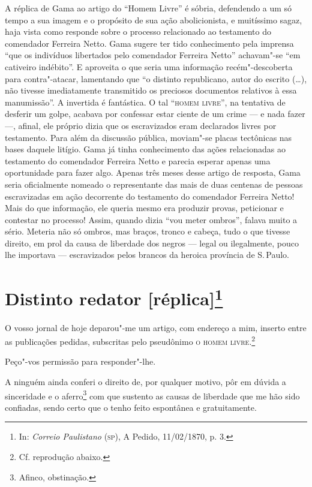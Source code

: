 {\small\noindent
A réplica de Gama ao artigo do ``Homem Livre'' é sóbria, defendendo
a um só tempo a sua imagem e o propósito de sua ação abolicionista, e
muitíssimo sagaz, haja vista como responde sobre o processo relacionado
ao testamento do comendador Ferreira Netto. Gama sugere ter tido
conhecimento pela imprensa ``que os indivíduos libertados pelo comendador
Ferreira Netto'' achavam"-se ``em cativeiro indébito''. E aproveita o que
seria uma informação recém"-descoberta para contra"-atacar, lamentando que
``o distinto republicano, autor do escrito (\ldots{}), não tivesse
imediatamente transmitido os preciosos documentos relativos à essa
manumissão''. A invertida é fantástica. O tal ``\textsc{homem livre}'', na tentativa
de desferir um golpe, acabava por confessar estar ciente de um crime ---
e nada fazer ---, afinal, ele próprio dizia que os escravizados eram
declarados livres por testamento. Para além da discussão pública,
moviam"-se placas tectônicas nas bases daquele litígio. Gama já tinha
conhecimento das ações relacionadas ao testamento do comendador Ferreira
Netto e parecia esperar apenas uma oportunidade para fazer algo. Apenas
três meses desse artigo de resposta, Gama seria oficialmente nomeado o
representante das mais de duas centenas de pessoas escravizadas em ação
decorrente do testamento do comendador Ferreira Netto! Mais do que
informação, ele queria mesmo era produzir provas, peticionar e
contestar no processo! Assim, quando dizia ``vou meter ombros'', falava
muito a sério. Meteria não só ombros, mas braços, tronco e cabeça, tudo
o que tivesse direito, em prol da causa de liberdade dos negros --- legal
ou ilegalmente, pouco lhe importava --- escravizados pelos brancos da
heroica província de S.\,Paulo. }


\chapter{Distinto redator {[}réplica{]}\footnote[*]{In: \emph{Correio
  Paulistano} (\textsc{sp}), A Pedido, 11/02/1870, p. 3.}}


O vosso jornal de hoje deparou"-me um artigo, com endereço a mim, inserto
entre as publicações pedidas, subscritas pelo pseudônimo \textsc{o homem
livre}.\footnote{Cf. reprodução abaixo.}

Peço"-vos permissão para responder"-lhe.

A ninguém ainda conferi o direito de, por qualquer motivo, pôr em dúvida
a sinceridade e o aferro\footnote{Afinco, obstinação.} com que
sustento as causas de liberdade que me hão sido confiadas, sendo certo
que o tenho feito espontânea e gratuitamente.

